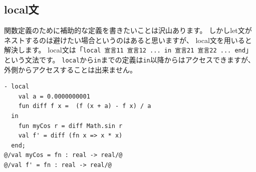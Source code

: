 \documentclass[11pt,a4paper]{article}
\begin{document}
\subsection{local文}

関数定義のために補助的な定義を書きたいことは沢山あります。
しかしlet文がネストするのは避けたい場合というのはあると思いますが、
local文を用いると解決します。
local文は「\lstinline{local 宣言11 宣言12 ... in 宣言21 宣言22 ... end}」という文法です。
\lstinline{local}から\lstinline{in}までの定義は\lstinline{in}以降からはアクセスできますが、
外側からアクセスすることは出来ません。

\begin{lstlisting}[caption=local文]
- local
    val a = 0.0000000001
    fun diff f x =  (f (x + a) - f x) / a
  in
    fun myCos r = diff Math.sin r
    val f' = diff (fn x => x * x)
  end;
@/val myCos = fn : real -> real/@
@/val f' = fn : real -> real/@
\end{lstlisting}





\end{document}
